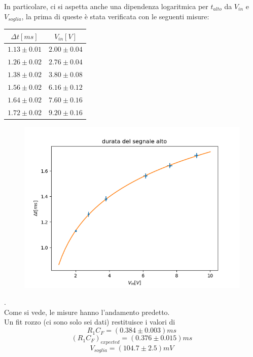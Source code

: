 \documentclass[10pt,a4paper]{article}
\begin{document}
In particolare, ci si aspetta anche una dipendenza logaritmica per $t_{alto}$ da $V_{in}$ e $V_{soglia}$, la prima di queste è stata verificata con le seguenti misure:
\begin{center}
\begin{tabular}{|c|c|}
	
	\hline 
	$\Delta t [ms]$ & $V_{in}[V]$ \\ 
	
	\hline 
	$1.13\pm0.01$ & $2.00\pm0.04$ \\ 
\hline 
	$1.26\pm 0.02$ & $2.76\pm0.04$ \\ 
\hline 
	$1.38\pm0.02$ & $3.80\pm0.08$ \\ 
	\hline 
	$1.56\pm0.02$ & $6.16\pm0.12$ \\ 
	\hline 
	$1.64\pm0.02$ & $7.60\pm0.16$ \\ 
	
	\hline 
	$1.72\pm0.02$ & $9.20\pm0.16$ \\ 
	\hline 

\end{tabular} 
\end{center}

\begin{figure}[h] \centering
	\includegraphics[scale=0.7]{Figure_1.png}
\end{figure}.\\
Come si vede, le misure hanno l'andamento predetto. \\Un fit rozzo (ci sono solo sei dati) restituisce i valori di \[R_1 C_F=(0.384\pm0.003) ms \] \[(R_1 C_F)_{expected}=(0.376\pm0.015) ms\] 
\[V_{soglia}=(104.7\pm2.5) mV\]
\end{document}
